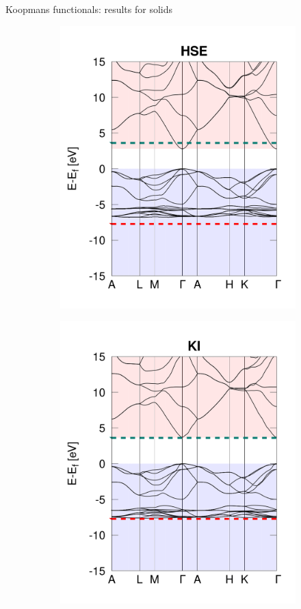 \documentclass[xcolor=table,aspectratio=169]{beamer}
\numberwithin{equation}{section}
\begin{document}
\begin{frame}{Koopmans functionals: results for solids}
\begin{figure}[t]
\begin{subfigure}{0.3\textwidth}
         \includegraphics[width=\columnwidth]{figures/ZnO_hse.png}
      \end{subfigure}
      \begin{subfigure}{0.3\textwidth}
         \includegraphics[width=\columnwidth]{figures/ZnO_ki.png}

\end{subfigure}
\end{figure}
\end{frame}
\end{document}
